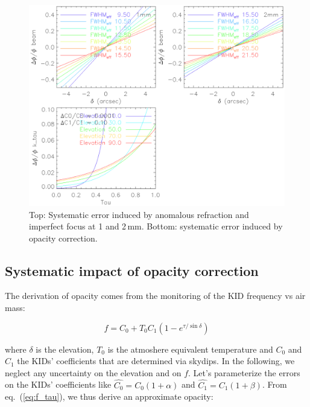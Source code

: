 \begin{figure}[hhh]
\begin{center}
\includegraphics[clip, angle=0, scale =0.8]{Figures/error_budget.eps}
\caption[Calibration error budget]{Top: Systematic error induced by anomalous refraction and imperfect
  focus at 1 and 2\,mm. Bottom: systematic error induced by opacity correction.}
\label{fig:error_budget}
\end{center}
\end{figure}

\subsection{Systematic impact of opacity correction}
\label{se:k_tau}

The derivation of opacity comes from the monitoring of the KID frequency vs air
mass:

\begin{equation}
f = C_0 + T_0C_1(1-e^{\tau/\sin\delta})
\label{eq:f_tau}
\end{equation}

where $\delta$ is the elevation, $T_0$ is the atmoshere equivalent temperature
and $C_0$ and $C_1$ the KIDs' coefficients that are determined via skydips. In
the following, we neglect any uncertainty on the elevation and on $f$. Let's
parameterize the errors on the KIDs' coefficients like $\hat{C_0} =
C_0(1+\alpha)$ and $\hat{C_1} = C_1(1+\beta)$. From eq.~(\ref{eq:f_tau}), we
thus derive an approximate opacity:

